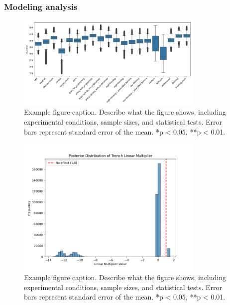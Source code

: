 \documentclass[12pt,a4paper]{article}
\begin{document}
\subsubsection{Modeling analysis}

\begin{figure}[H]
    \centering
    \includegraphics[width=0.8\textwidth]{"../ea_boxplot.png"}
    \caption{Example figure caption. Describe what the figure shows, including experimental conditions, sample sizes, and statistical tests. Error bars represent standard error of the mean. *p < 0.05, **p < 0.01.}
    \label{fig:example}
\end{figure}

\begin{figure}[H]
    \centering
    \includegraphics[width=0.8\textwidth]{"../linear_multiplier.png"}
    \caption{Example figure caption. Describe what the figure shows, including experimental conditions, sample sizes, and statistical tests. Error bars represent standard error of the mean. *p < 0.05, **p < 0.01.}
    \label{fig:example}
\end{figure}
\end{document}

